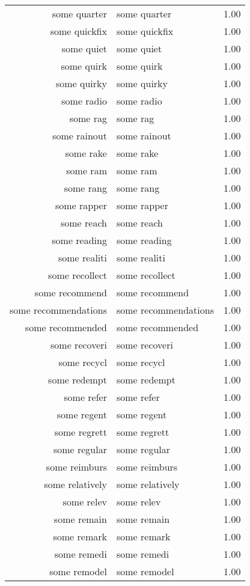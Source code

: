 \begin{table}[ht]
\begin{tabular}{rlr}
  some quarter & some quarter & 1.00 \\ 
  some quickfix & some quickfix & 1.00 \\ 
  some quiet & some quiet & 1.00 \\ 
  some quirk & some quirk & 1.00 \\ 
  some quirky & some quirky & 1.00 \\ 
  some radio & some radio & 1.00 \\ 
  some rag & some rag & 1.00 \\ 
  some rainout & some rainout & 1.00 \\ 
  some rake & some rake & 1.00 \\ 
  some ram & some ram & 1.00 \\ 
  some rang & some rang & 1.00 \\ 
  some rapper & some rapper & 1.00 \\ 
  some reach & some reach & 1.00 \\ 
  some reading & some reading & 1.00 \\ 
  some realiti & some realiti & 1.00 \\ 
  some recollect & some recollect & 1.00 \\ 
  some recommend & some recommend & 1.00 \\ 
  some recommendations & some recommendations & 1.00 \\ 
  some recommended & some recommended & 1.00 \\ 
  some recoveri & some recoveri & 1.00 \\ 
  some recycl & some recycl & 1.00 \\ 
  some redempt & some redempt & 1.00 \\ 
  some refer & some refer & 1.00 \\ 
  some regent & some regent & 1.00 \\ 
  some regrett & some regrett & 1.00 \\ 
  some regular & some regular & 1.00 \\ 
  some reimburs & some reimburs & 1.00 \\ 
  some relatively & some relatively & 1.00 \\ 
  some relev & some relev & 1.00 \\ 
  some remain & some remain & 1.00 \\ 
  some remark & some remark & 1.00 \\ 
  some remedi & some remedi & 1.00 \\ 
  some remodel & some remodel & 1.00 \\ 

\end{tabular}
\end{table}
